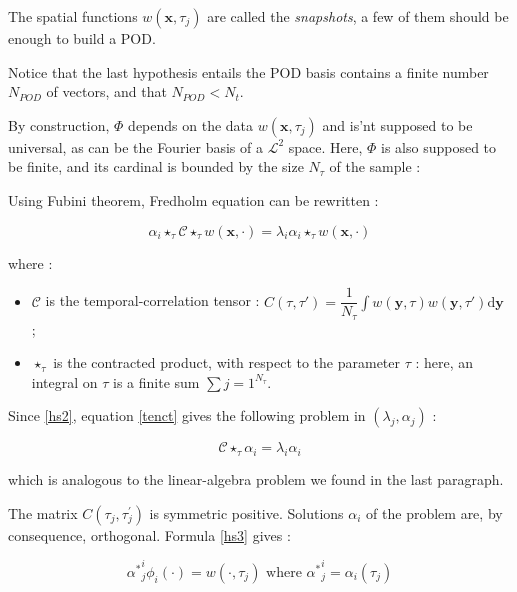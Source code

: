 The spatial functions $w(\mathbf{x}, \tau_j)$ are called the \emph{snapshots}, a few of them should be enough to build a POD.

\par
Notice that the last hypothesis entails the POD basis contains a finite number $N_{POD}$ of vectors, and that $N_{POD}<N_t$.

\par
By construction, $\Phi$ depends on the data $w(\mathbf{x},\tau_j)$ and is'nt supposed to be universal, as can be the Fourier basis of a $\mathcal{L}^2$ space. %
Here, $\Phi$ is also supposed to be finite, and its cardinal is bounded by the size $N_{\tau}$ of the sample :


Using Fubini theorem, Fredholm equation can be rewritten :

\begin{equation}\label{tenct}
\alpha_i\star_{\tau}\mathcal{C}\star_{\tau}w(\mathbf{x},\cdot)=\lambda_i\alpha_i\star_{\tau}w(\mathbf{x},\cdot)
\end{equation}

where :
\begin{itemize}
\item $\mathcal{C}$ is the temporal-correlation tensor : $\displaystyle C(\tau,\tau ')=\dfrac{1}{N_{\tau}}\int w(\mathbf{y},\tau)w(\mathbf{y},\tau')\text{d}\mathbf{y}$ ;
\item $\star_{\tau}$ is the contracted product, with respect to the parameter $\tau$ : here, an integral on $\tau$ is a finite sum $\sum\limits{j=1}^{N_{\tau}}$.
\end{itemize}

Since \ref{hs2}, equation \ref{tenct} gives the following problem in $(\lambda_j , \alpha_j)$ :

\begin{equation}\label{tenct}
\mathcal{C}\star_{\tau}\alpha_i\mathbf=\lambda_i\alpha_i
\end{equation}

which is analogous to the linear-algebra problem we found in the last paragraph.

\par
The matrix $C(\tau_j,\tau_j^{'})$ is symmetric positive. Solutions $\alpha_i$ of the problem are, by consequence, %
orthogonal. Formula \ref{hs3} gives :

\[{\alpha^{\ast}}_j^i\phi_i(\cdot )=w(\cdot ,\tau_j)\text{ where ${\alpha^{\ast}}_j^i=\alpha_i(\tau_j)$}\]

